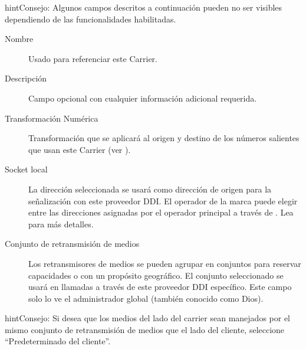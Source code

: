 \documentclass[letterpaper,10pt,spanish]{sphinxmanual}
\begin{document}
\begin{notice}{hint}{Consejo:}
Algunos campos descritos a continuación pueden no ser visibles dependiendo de las funcionalidades habilitadas.
\begin{description}
\item[{Nombre}] \leavevmode
Usado para referenciar este Carrier.

\item[{Descripción}] \leavevmode
Campo opcional con cualquier información adicional requerida.

\item[{Transformación Numérica}] \leavevmode
Transformación que se aplicará al origen y destino de los números salientes que usan este Carrier (ver {\hyperref[administration_portal/brand/settings/numeric_transformations:numeric\string-transformations]{}}).

\item[{Socket local}] \leavevmode
La dirección seleccionada se usará como dirección de origen para la señalización con este proveedor DDI. El operador de la marca puede elegir entre las direcciones asignadas por el operador principal a través de {\hyperref[administration_portal/platform/brands:brands]{}}. Lea {\hyperref[administration_portal/platform/infrastructure/proxy_trunks:proxy\string-trunks]{}} para más detalles.

\item[{Conjunto de retransmisión de medios}] \leavevmode
Los retransmisores de medios se pueden agrupar en conjuntos para reservar capacidades o con un propósito geográfico. El conjunto seleccionado se usará en llamadas a través de este proveedor DDI específico. Este campo solo lo ve el administrador global (también conocido como Dios).

\end{description}
\end{notice}

\begin{notice}{hint}{Consejo:}
Si desea que los medios del lado del carrier sean manejados por el mismo conjunto de retransmisión de medios que el lado del cliente, seleccione ``Predeterminado del cliente''.
\end{notice}
\end{document}
